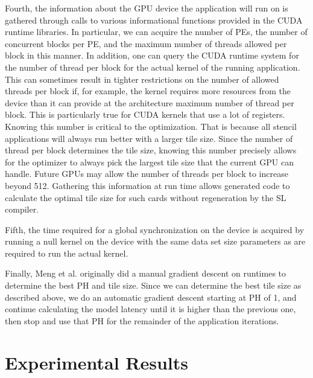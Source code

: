 \documentclass{styles/sig-alternate}
\begin{document}
Fourth, the information about the GPU device the application will run on is gathered through calls
to various informational functions provided in the CUDA runtime libraries.  In particular, we can acquire 
the number of PEs, the number of concurrent blocks per PE, and the maximum number of threads allowed 
per block in this manner.  In addition, one can query the CUDA runtime system for the number of 
thread per block for the actual kernel of the running application.  This can sometimes result in 
tighter restrictions on the number of allowed threads per block if, for example, the kernel requires 
more resources from the device than it can provide at the architecture maximum number of thread per block.  
This is particularly true for CUDA kernels that use a lot of registers.  
Knowing this number is critical to the optimization.  That is because all stencil applications 
will always run better with a larger tile size.  Since the number of thread per block determines the tile size, 
knowing this number precisely allows for the optimizer to always pick the largest tile size that the current GPU can handle.
Future GPUs may allow the number of threads per block to increase beyond 512.  Gathering this information at run time
allows generated code to calculate the optimal tile size for such cards without regeneration by the SL compiler.

Fifth, the time required for a global synchronization on the device is acquired by 
running a null kernel on the device with the same data set size parameters as are required to run the actual kernel.

Finally, Meng et al. originally did a manual gradient descent on runtimes to determine 
the best PH and tile size.  Since we can determine the best tile size as described above, 
we do an automatic gradient descent starting at PH of 1, 
and continue calculating the model latency until it is higher than the previous one, 
then stop and use that PH for the remainder of the application iterations.

\section{Experimental Results}
\end{document}
